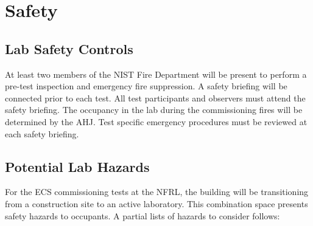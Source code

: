 \documentclass[12pt,oneside]{book}
\begin{document}
\chapter{Safety}
\label{safety}
\section{Lab Safety Controls}
\label{controls}
At least two members of the NIST Fire Department will be present to perform a pre-test inspection and emergency fire suppression. A safety briefing will be connected prior to each test. All test participants and observers must attend the safety briefing. The occupancy in the lab during the commissioning fires will be determined by the AHJ. Test specific emergency procedures must be reviewed at each safety briefing.

\section{Potential Lab Hazards}
\label{lab_hazards}
For the ECS commissioning tests at the NFRL, the building will be transitioning from a construction site to an active laboratory. This combination space presents safety hazards to occupants. A partial lists of hazards to consider follows:
\end{document}
